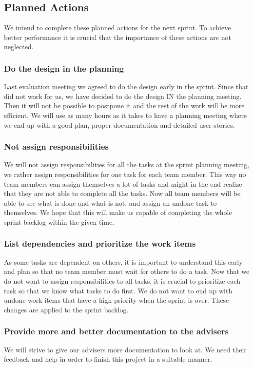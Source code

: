 \subsection{Planned Actions}
We intend to complete these planned actions for the next sprint. To achieve better performance it is crucial that the importance of these actions are not neglected.

\subsubsection{Do the design in the planning}
Last evaluation meeting we agreed to do the design early in the sprint. Since that did not work for us, we have decided to do the design IN the planning meeting. Then it will not be possible to postpone it and the rest of the work will be more efficient. We will use as many hours as it takes to have a planning meeting where we end up with a good plan, proper documentation and detailed user stories.

\subsubsection{Not assign responsibilities}
We will not assign responsibilities for all the tasks at the sprint planning meeting, we rather assign responsibilities for one task for each team member. This way no team members can assign themselves a lot of tasks and might in the end realize that they are not able to complete all the tasks. Now all team members will be able to see what is done and what is not, and assign an undone task to themselves. We hope that this will make us capable of completing the whole sprint backlog within the given time.

\subsubsection{List dependencies and prioritize the work items}
As some tasks are dependent on others, it is important to understand this early and plan so that no team member must wait for others to do a task. Now that we do not want to assign responsibilities to all tasks, it is crucial to prioritize each task so that we know what tasks to do first. We do not want to end up with undone work items that have a high priority when the sprint is over. These changes are applied to the sprint backlog.

\subsubsection{Provide more and better documentation to the advisers}
We will strive to give our advisers more documentation to look at. We need their feedback and help in order to finish this project in a suitable manner. 



